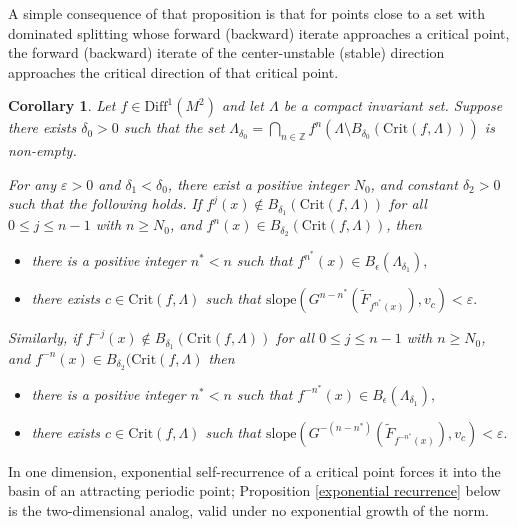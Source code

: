 \documentclass[a4paper,11pt]{article}
\newtheorem{corollary}[lemma]{Corollary}
\theoremstyle{definition}
\def\La{\Lambda}
\def\e{\epsilon}
\def\de{\delta}
\def\La{\Lambda}
\begin{document}
A simple consequence of that proposition is that for points close to a set with dominated splitting whose forward (backward) iterate approaches a critical point, the forward (backward) iterate of the center-unstable (stable) direction approaches the critical direction of that critical point. 


\begin{corollary}\label{cor:compatibility} 
Let $f\in \mathrm{Diff}^1(M^2)$ and let $\Lambda$ be a compact invariant set. Suppose there exists $\delta_0>0$ such that the set $\Lambda_{\delta_0}=\bigcap_{n\in \mathbb{Z}} f^n\!\left(\Lambda\setminus B_{\delta_0}(\mathrm{Crit}(f, \Lambda))\right)$ is non-empty.

For any $\varepsilon>0$ and $\de_1<\de_0$, there exist a positive integer $N_0$, and constant $\delta_2>0$ such that the following holds. If  $f^{j}(x)\notin B_{\delta_1}(\mathrm{Crit}(f,\Lambda))$ for all $0\leq j\leq n-1$ with $n\geq N_0$, and $f^n(x)\in B_{\delta_2}(\mathrm{Crit}(f,\La))$, then 

\begin{itemize}
    \item[--] there is a positive integer $n^*<n$ such that $f^{n^*}(x)\in B_\e(\La_{\de_1}),$
    \item[--]  
there exists $c\in \mathrm{Crit}(f, \Lambda)$ such that $\mathrm{slope}(G^{n-n^*}(\widetilde{F}_{f^{n^*}(x)}), v_c)<\varepsilon.$
\end{itemize}

Similarly, if  $f^{-j}(x)\notin B_{\delta_1}(\mathrm{Crit}(f,\Lambda))$ for all $0\leq j\leq n-1$ with $n\geq N_0$, and $f^{-n}(x)\in B_{\delta_2}(\mathrm{Crit}(f, \Lambda)$ then 

\begin{itemize}
    \item[--] there is a positive integer $n^*<n$ such that $f^{-n^*}(x)\in B_\e(\La_{\de_1}),$
    \item[--] there exists $c\in \mathrm{Crit}(f, \Lambda)$ such that $\mathrm{slope}(G^{-(n-n^*)}(\widetilde{F}_{f^{-n^*}(x)}), v_c)<\varepsilon.$
\end{itemize}


\end{corollary}





In one dimension, exponential self-recurrence of a critical point forces it into the basin of an attracting periodic point; Proposition \ref{exponential recurrence} below is the two-dimensional analog, valid under no exponential growth of the norm.
\end{document}
